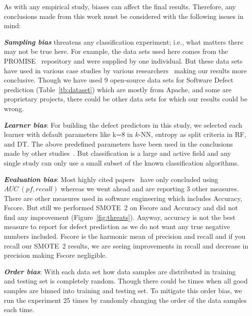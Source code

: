 \documentclass[sigconf,review, anonymous]{acmart}
\theoremstyle{break}
\theoremstyle{break}
\begin{document}
As with any empirical study, biases can affect the final
results. Therefore, any conclusions made from this work must be considered with the following issues in mind:

\textbf{\textit{Sampling bias}} threatens any classification experiment; i.e., what matters there may not be true here. For example, the data sets used here comes from the PROMISE~\cite{promiserepo} repository and were supplied by one individual. But these data sets have used in various case studies by various researchers~\cite{he2012investigation,peters2013better,peters2013balancing,turhan2013empirical} making our results more conclusive.
Though we have used 9 open-source data sets for Software Defect prediction (Table~\ref{tb:dataset}) which are mostly from Apache, and some are proprietary projects, there could be other data sets for which our results could be wrong.

\textbf{\textit{Learner bias}}: For building the defect predictors in this
study, we selected each learner with default parameters like k=8 in $k$-NN, entropy as split criteria in RF, and DT. The above predefined parameters have been used in the conclusions made by other studies~\cite{ghotra2015revisiting,tantithamthavorn2016automated}. But classification is a large and active field and any single study can only use a small subset of the known classification algorithms.

\textbf{\textit{Evaluation bias}}: Most highly cited papers~\cite{ghotra2015revisiting,tantithamthavorn2016automated} have only concluded using $AUC\ (pf, recall)$ whereas we went ahead and are reporting 3 other measures. There are other measures used in software engineering which includes Accuracy, Fscore. But still we performed SMOTE~2 on Fscore and Accuracy and did not find any improvement (Figure~\ref{fig:threats}). Anyway, accuracy is not the best measure to report for defect prediction as we do not want any true negative numbers included. Fscore is the harmonic mean of precision and recall and if you recall our SMOTE~2 results, we are seeing  improvements in recall and  decrease in precision making Fscore negligible.

\textbf{\textit{Order bias}}: With each data set how data samples are distributed in training and testing set is completely random. Though there could be times when all good samples are binned into training and testing set. To mitigate this order bias, we run
the experiment 25 times by randomly changing the order of the data samples each time.
\end{document}
